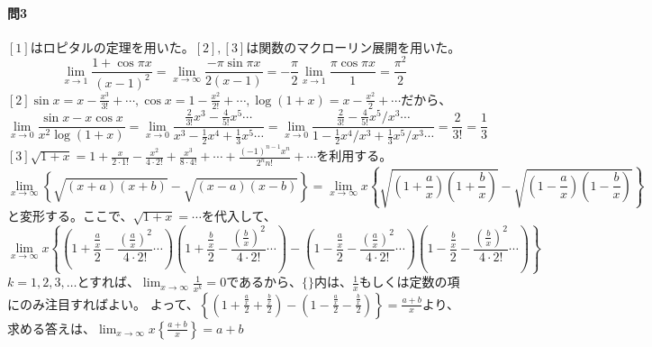 \documentclass[a4j,dvipdfmx]{jsarticle}
\begin{document}
                \paragraph{問3}$[1]$はロピタルの定理を用いた。$[2],[3]$は関数のマクローリン展開を用いた。
                    \begin{equation*}
                        \lim_{x\to 1}\frac{1+\cos \pi x}{(x-1)^2}=\lim_{x\to\infty}\frac{-\pi\sin\pi x}{2(x-1)}=-\frac{\pi}{2}\lim_{x\to 1}\frac{\pi\cos\pi x}{1}=\frac{\pi^2}{2}
                    \end{equation*}
                    $[2]\displaystyle\sin x = x-\frac{x^3}{3!}+\cdots,\cos x = 1-\frac{x^2}{2!}+\cdots,\log(1+x)=x-\frac{x^2}{2}+\cdots$だから、
                    \begin{equation*}
                        \lim_{x\to0}\frac{\sin x-x\cos x}{x^2\log(1+x)}=\lim_{x\to0}\frac{\frac{2}{3!}x^3-\frac{4}{5!}x^5\cdots}{x^3-\frac{1}{2}x^4+\frac{1}{3}x^5\cdots}=\lim_{x\to0}\frac{\frac{2}{3!}-\frac{4}{5!}x^5/x^3\cdots}{1-\frac{1}{2}x^4/x^3+\frac{1}{3}x^5/x^3\cdots}=\frac{2}{3!}=\frac{1}{3}
                    \end{equation*}
                    $[3]\displaystyle \sqrt{1+x}=1+\frac{x}{2\cdot 1!}-\frac{x^2}{4\cdot 2!}+\frac{x^3}{8\cdot 4!}+\cdots+\frac{(-1)^{n-1}x^n}{2^nn!}+\cdots$を利用する。
                    \begin{equation*}
                        \lim_{x\to\infty}\left\{\sqrt{(x+a)(x+b)}-\sqrt{(x-a)(x-b)}\right\}=\lim_{x\to\infty}x\left\{\sqrt{\left(1+\frac{a}{x}\right)\left(1+\frac{b}{x}\right)}-\sqrt{\left(1-\frac{a}{x}\right)\left(1-\frac{b}{x}\right)}\right\}
                    \end{equation*}
                    と変形する。ここで、$\sqrt{1+x}=\cdots$を代入して、
                    \begin{equation*}
                        \lim_{x\to\infty}x\left\{\left(1+\frac{\frac{a}{x}}{2}-\frac{\left(\frac{a}{x}\right)^2}{4\cdot 2!}\cdots\right)\left(1+\frac{\frac{b}{x}}{2}-\frac{\left(\frac{b}{x}\right)^2}{4\cdot 2!}\cdots\right)-\left(1-\frac{\frac{a}{x}}{2}-\frac{\left(\frac{a}{x}\right)^2}{4\cdot 2!}\cdots\right)\left(1-\frac{\frac{b}{x}}{2}-\frac{\left(\frac{b}{x}\right)^2}{4\cdot 2!}\cdots\right)\right\}
                    \end{equation*}
                    $k=1,2,3,\dots$とすれば、$\displaystyle \lim_{x\to\infty}\frac{1}{x^k}= 0$であるから、$\{$\hspace{2mm}$\}$内は、$\frac{1}{x}$もしくは定数の項にのみ注目すればよい。
                    よって、$\displaystyle \left\{(1+\frac{\frac{a}{x}}{2}+\frac{\frac{b}{x}}{2})-\left(1-\frac{\frac{a}{x}}{2}-\frac{\frac{b}{x}}{2}\right)\right\}=\frac{a+b}{x}$より、求める答えは、$\displaystyle\lim_{x\to\infty}x\left\{\frac{a+b}{x}\right\}=a+b$
\end{document}
